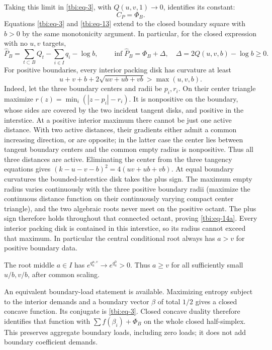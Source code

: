 Taking this limit in \eqref{tbi:eq-3}, with \(Q(u,v,1)\to0\), identifies its constant:
\begin{equation}\label{tbi:eq-13}
C_P=\Phi_B.
\end{equation}
Equations \eqref{tbi:eq-3} and \eqref{tbi:eq-13} extend to the closed boundary square with \(b>0\) by the same monotonicity argument. In particular, for the closed expression with no \(u,v\) targets,
\begin{equation}\label{tbi:eq-14}
\widehat P_B=\sum_{t\subset B}Q_t-\sum_{i\in I}q_i-\log b,
\qquad
\inf\widehat P_B=\Phi_B+\Delta,\quad
\Delta=2Q(u,v,b)-\log b\ge0.
\end{equation}
For positive boundaries, every interior packing disk has curvature at least
\begin{equation}\label{tbi:eq-14a}
u+v+b+2\sqrt{uv+ub+vb}>\max(u,v,b).
\end{equation}
Indeed, let the three boundary centers and radii be \(p_i,r_i\). On their center triangle maximize \(r(z)=\min_i(|z-p_i|-r_i)\). It is nonpositive on the boundary, whose sides are covered by the two incident tangent disks, and positive in the interstice. At a positive interior maximum there cannot be just one active distance. With two active distances, their gradients either admit a common increasing direction, or are opposite; in the latter case the center lies between tangent boundary centers and the common empty radius is nonpositive. Thus all three distances are active. Eliminating the center from the three tangency equations gives \((k-u-v-b)^2=4(uv+ub+vb)\). At equal boundary curvatures the bounded-interstice disk takes the plus sign. The maximum empty radius varies continuously with the three positive boundary radii (maximize the continuous distance function on their continuously varying compact center triangle), and the two algebraic roots never meet on the positive octant. The plus sign therefore holds throughout that connected octant, proving \eqref{tbi:eq-14a}. Every interior packing disk is contained in this interstice, so its radius cannot exceed that maximum. In particular the central conditional root always has \(a>v\) for positive boundary data.

The root middle \(a\in I\) has \(e^{q_a^{u,v}}\to e^{q_a^0}>0\). Thus \(a\ge v\) for all sufficiently small \(u/b,v/b\), after common scaling.

An equivalent boundary-load statement is available. Maximizing entropy subject to the interior demands and a boundary vector \(\beta\) of total \(1/2\) gives a closed concave function. Its conjugate is \eqref{tbi:eq-3}. Closed concave duality therefore identifies that function with \(\sum f(\beta_i)+\Phi_B\) on the whole closed half-simplex. This preserves aggregate boundary loads, including zero loads; it does not add boundary coefficient demands.

